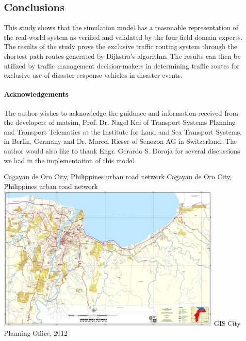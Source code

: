 \subsection{Conclusions}
This study shows that the simulation model has a reasonable representation of the real-world system as verified and validated by the four field domain experts. The results of the study prove the exclusive traffic routing system through the shortest path routes generated by Dijkstra’s algorithm. The results can then be utilized by traffic management decision-makers in determining traffic routes for exclusive use of disaster response vehicles in disaster events.

\paragraph{Acknowledgements}
The author wishes to acknowledge the guidance and information received from the developers of \gls{matsim}, Prof. Dr. Nagel Kai of Transport Systems Planning and Transport Telematics at the Institute for Land and Sea Transport Systems, in Berlin, Germany and Dr. Marcel Rieser of Senozon AG in Switzerland. The author would also like to thank Engr. Gerardo S. Doroja for several discussions we had in the implementation of this model.

\createfigure%
{Cagayan de Oro City, Philippines urban road network}%
{Cagayan de Oro City, Philippines urban road network}%
{\label{fig:philippines_fig1}}%
{\includegraphics[width=0.85\textwidth, angle=0]{./using/figures/philippines_fig1.png}}%
{GIS City Planning Office, 2012}

